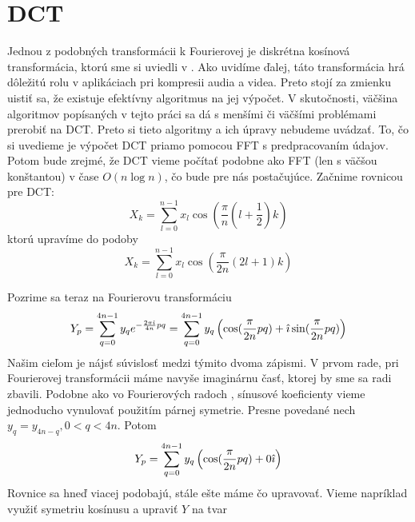 \section{DCT}

Jednou z podobných transformácii k Fourierovej je diskrétna kosínová
transformácia, ktorú sme si uviedli v \todo{}. Ako uvidíme ďalej, táto
transformácia hrá dôležitú rolu v aplikáciach pri kompresii audia a
videa. Preto stojí za zmienku uistiť sa, že existuje efektívny
algoritmus na jej výpočet. V skutočnosti, väčšina algoritmov
popísaných v tejto práci sa dá s menšími či väčšími problémami
prerobiť na DCT. Preto si tieto algoritmy a ich úpravy nebudeme
uvádzať. To, čo si uvedieme je výpočet DCT priamo pomocou FFT s
predpracovaním údajov. Potom bude zrejmé, že DCT vieme počítať podobne
ako FFT (len s väčšou konštantou) v čase $O(n \log n)$,
čo bude pre nás postačujúce.
Začnime rovnicou pre DCT:
\begin{equation}
    X_k = \sum_{l=0}^{n-1} x_l \cos\left(
        \frac{\pi}{n} (l + \frac{1}{2}) k
        \right)
\end{equation}
ktorú upravíme do podoby
\begin{equation}
    X_k = \sum_{l=0}^{n-1} x_l \cos\left(
        \frac{\pi}{2n} (2l + 1) k
        \right)
\end{equation}

Pozrime sa teraz na Fourierovu transformáciu
\begin{equation}
    Y_p = \sum_{q=0}^{4n-1} y_q e^{-\frac{2\pi\hat{\imath}}{4n} p q} =
          \sum_{q=0}^{4n-1} y_q \left(
                \cos ( \frac{\pi}{2 n} p q )
                + \hat{\imath} \sin ( \frac{\pi}{2n} p q)
                \right)
\end{equation}
Našim cieľom je nájsť súvislosť medzi týmito dvoma zápismi. V prvom
rade, pri Fourierovej transformácii máme navyše imaginárnu časť,
ktorej by sme sa radi zbavili. Podobne ako vo Fourierových radoch
\todo{}, sínusové koeficienty vieme jednoducho vynulovať použitím
párnej symetrie. Presne povedané nech $y_q = y_{4n-q}, 0<q<4n$.
Potom
\begin{equation}
    Y_p =    \sum_{q=0}^{4n-1} y_q \left(
                \cos ( \frac{\pi}{2 n} p q )
                +  0 \hat{\imath} 
                \right)
\end{equation}
Rovnice  sa hneď viacej podobajú, stále ešte máme čo
upravovať. Vieme napríklad využiť symetriu kosínusu a upraviť $Y$ na
tvar

